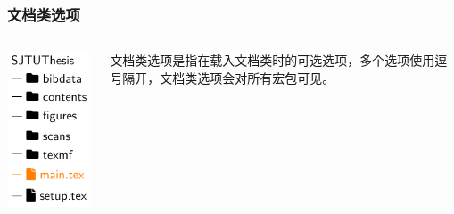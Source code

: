 \begin{frame}[fragile]
  \frametitle{文档类选项}
  \begin{columns}
    \begin{column}{0.35\textwidth}
      \includegraphics[page=1]{support/figures/thesisdir.pdf}
    \end{column}
    \begin{column}{0.65\textwidth}
      文档类选项是指在载入文档类时的可选选项，多个选项使用逗号隔开，文档类选项会对所有宏包可见。
    \end{column}
  \end{columns}
\end{frame}

